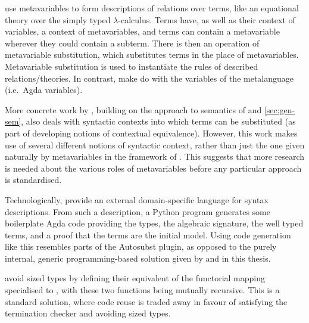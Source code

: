 
 use metavariables to form descriptions of relations over
terms, like an equational theory over the simply typed $\lambda$-calculus.
Terms have, as well as their context of variables, a context of metavariables,
and terms can contain a metavariable wherever they could contain a subterm.
There is then an operation of metavariable substitution, which substitutes terms
in the place of metavariables.
Metavariable substitution is used to instantiate the rules of described
relations/theories.
In contrast, \citeauthor{AACMM21} make do with the variables of the metalanguage
(i.e.\ Agda variables).

More concrete work by \citet{MMS18}, building on the approach to semantics of
\citet{ACMM17} and \cref{sec:gen-sem}, also deals with syntactic contexts into
which terms can be substituted (as part of developing notions of contextual
equivalence).
However, this work makes use of several different notions of syntactic context,
rather than just the one given naturally by metavariables in the framework of
\citeauthor{FS22}.
This suggests that more research is needed about the various roles of
metavariables before any particular approach is standardised.

Technologically, \citeauthor{FS22} provide an external domain-specific language
for syntax descriptions.
From such a description, a Python program generates some boilerplate Agda code
providing the types, the algebraic signature, the well typed terms, and a proof
that the terms are the initial model.
Using code generation like this resembles parts of the Autosubst plugin, as
opposed to the purely internal, generic programming-based solution given by
\citeauthor{AACMM21} and in this thesis.

 avoid sized types by defining their equivalent of the
functorial mapping  specialised to , with
these two functions being mutually recursive.
This is a standard solution, where code reuse is traded away in favour of
satisfying the termination checker and avoiding sized types.

